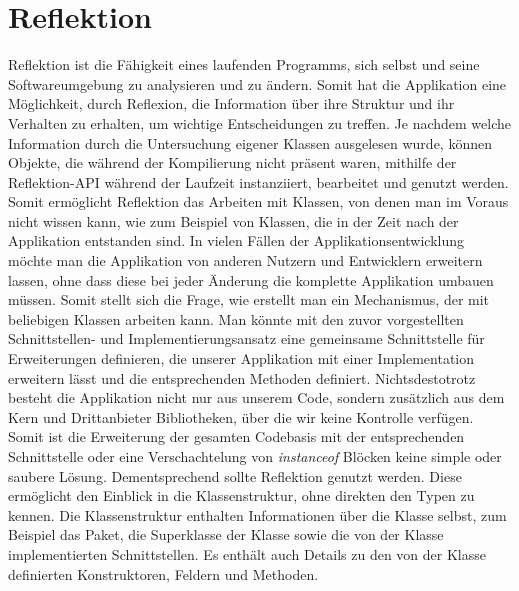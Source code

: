 \section{Reflektion}\label{sec:refl}
  Reflektion ist die Fähigkeit eines laufenden Programms, sich selbst und seine Softwareumgebung zu analysieren und zu ändern. 
  Somit hat die Applikation eine Möglichkeit, durch Reflexion, die Information über ihre Struktur und ihr Verhalten zu erhalten, um wichtige Entscheidungen zu treffen. Je nachdem welche Information durch die Untersuchung eigener Klassen ausgelesen wurde, können Objekte, die während der Kompilierung nicht präsent waren, mithilfe der Reflektion-API während der Laufzeit instanziiert, bearbeitet und genutzt werden. Somit ermöglicht Reflektion das Arbeiten mit Klassen, von denen man im Voraus nicht wissen kann, wie zum Beispiel von Klassen, die in der Zeit nach der Applikation entstanden sind.\bigbreak 
  In vielen Fällen der Applikationsentwicklung möchte man die Applikation von anderen Nutzern und Entwicklern erweitern lassen, ohne dass diese bei jeder Änderung die komplette Applikation umbauen müssen. Somit stellt sich die Frage, wie erstellt man ein Mechanismus, der mit beliebigen Klassen arbeiten kann.\newline
  Man könnte mit den zuvor vorgestellten Schnittstellen- und Implementierungsansatz eine gemeinsame Schnittstelle für Erweiterungen definieren, die unserer Applikation mit einer Implementation erweitern lässt und die entsprechenden Methoden definiert. Nichtsdestotrotz besteht die Applikation nicht nur aus unserem Code, sondern zusätzlich aus dem Kern und Drittanbieter Bibliotheken, über die wir keine Kontrolle verfügen. Somit ist die Erweiterung der gesamten Codebasis mit der entsprechenden Schnittstelle oder eine Verschachtelung von \textit{instanceof} Blöcken keine simple oder saubere Lösung. Dementsprechend sollte Reflektion genutzt werden. Diese ermöglicht den Einblick in die Klassenstruktur, ohne direkten den Typen zu kennen. Die Klassenstruktur enthalten Informationen über die Klasse selbst, zum Beispiel das Paket, die Superklasse der Klasse sowie die von der Klasse implementierten Schnittstellen. Es enthält auch Details zu den von der Klasse definierten Konstruktoren, Feldern und Methoden.\bigbreak

